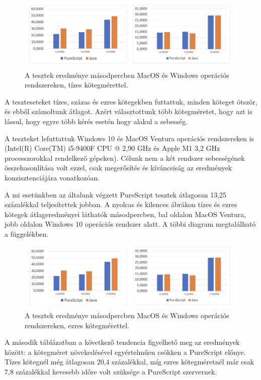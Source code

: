 \documentclass[12pt]{article}
\begin{document}
\begin{figure}[h!]
	\includegraphics[width=\textwidth]{diag10}
	\caption{A tesztek eredménye másodpercben MacOS és Windows operációs rendszereken, tízes kötegmérettel.}
\end{figure}

A teszteseteket tízes, százas és ezres kötegekben futtattuk, minden köteget ötször, és ebből számoltunk átlagot. Azért választottunk több kötegméretet, hogy azt is lássul, hogy egyre több kérés esetén hogy alakul a sebesség.

A teszteket lefuttattuk Windows 10 és MacOS Ventura operációs rendszereken is (Intel(R) Core(TM) i5-9400F CPU @ 2,90 GHz és Apple M1 3,2 GHz processzorokkal rendelkező gépeken). Célunk nem a két rendszer sebességének összehasonlítása volt ezzel, csak megerősítés és kíváncsiság az eredmények konzisztenciájára vonatkozóan.

A mi esetünkben az általunk végzett PureScript tesztek átlagosan 13,25 százalékkal teljesítettek jobban.  A nyolcas és kilences ábrákon tízes és ezres kötegek átlageredményei láthatók másodpercben, bal oldalon MacOS Ventura, jobb oldalon Windows 10 operációs rendszer alatt. A többi diagram megtalálható a függelékben.

\begin{figure}[h!]
	\includegraphics[width=\textwidth]{diag1000}
	\caption{A tesztek eredménye másodpercben MacOS és Windows operációs rendszereken, ezres kötegmérettel.}
\end{figure}

A második táblázatban a következő tendencia figyelhető meg az eredmények között: a kötegméret növekedésével egyértelműen csökken a PureScript előnye. Tízes kötegnél még átlagosan 20,4 százalékkal, míg ezres kötegméretnél már csak 7,8 százalékkal kevesebb időre volt szüksége a PureScript szervernek.
\end{document}
